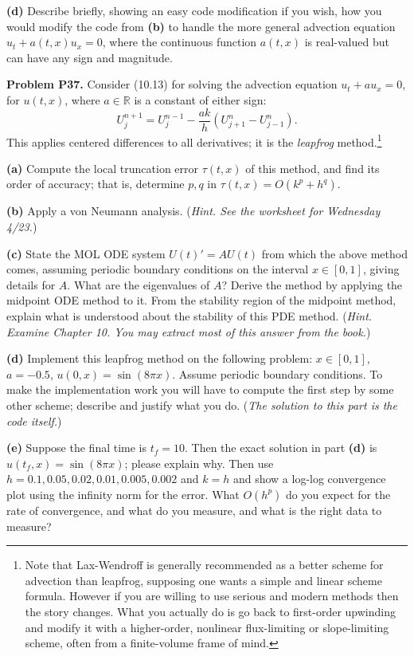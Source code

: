 \documentclass[12pt]{amsart}
\newcommand{\RR}{\mathbb{R}}
\newcommand{\prob}[1]{\bigskip\noindent\textbf{#1}\quad }
\newcommand{\epart}[1]{\medskip\noindent\textbf{(#1)}\quad }
\begin{document}
\epart{d}  Describe briefly, showing an easy code modification if you wish, how you would modify the code from \textbf{(b)} to handle the more general advection equation $u_t + a(t,x) u_x = 0$, where the continuous function $a(t,x)$ is real-valued but can have any sign and magnitude.


\prob{Problem P37.}  Consider (10.13) for solving the advection equation $u_t + a u_x = 0$, for $u(t,x)$, where $a\in\RR$ is a constant of either sign:
    $$U_j^{n+1} = U_j^{n-1} - \frac{ak}{h}(U_{j+1}^n - U_{j-1}^n).$$
This applies centered differences to all derivatives; it is the \emph{leapfrog} method.\footnote{Note that Lax-Wendroff is generally recommended as a better scheme for advection than leapfrog, supposing one wants a simple and linear scheme formula.  However if you are willing to use serious and modern methods then the story changes.  What you actually do is go back to first-order upwinding and modify it with a higher-order, nonlinear flux-limiting or slope-limiting scheme, often from a finite-volume frame of mind.}

\epart{a} Compute the local truncation error $\tau(t,x)$ of this method, and find its order of accuracy; that is, determine $p,q$ in $\tau(t,x) = O(k^p + h^q)$.

\epart{b} Apply a von Neumann analysis.  (\emph{Hint.  See the worksheet for Wednesday 4/23.})

\epart{c} State the MOL ODE system $U(t)' = A U(t)$ from which the above method comes, assuming periodic boundary conditions on the interval $x\in[0,1]$, giving details for $A$.  What are the eigenvalues of $A$?  Derive the method by applying the midpoint ODE method to it.  From the stability region of the midpoint method, explain what is understood about the stability of this PDE method.  (\emph{Hint. Examine Chapter 10.  You may extract most of this answer from the book.})

\epart{d} Implement this leapfrog method on the following problem:  $x\in[0,1]$, $a = -0.5$, $u(0,x)=\sin(8\pi x)$.  Assume periodic boundary conditions.  To make the implementation work you will have to compute the first step by some other scheme; describe and justify what you do.  (\emph{The solution to this part is the code itself.})

\epart{e} Suppose the final time is $t_f=10$.  Then the exact solution in part \textbf{(d)} is $u(t_f,x) = \sin(8\pi x)$; please explain why.  Then use $h=0.1,0.05,0.02,0.01,0.005,0.002$ and $k=h$ and show a log-log convergence plot using the infinity norm for the error.  What $O(h^p)$ do you expect for the rate of convergence, and what do you measure, and what is the right data to measure?
\end{document}
